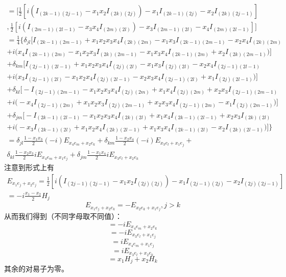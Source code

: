 \documentclass{ctexart}
\begin{document}
	\begin{multline}
	[E_{x_1e_j+x_2e_k},E_{x_3e_l+x_4e_m}]\\=\bigg[\frac{1}{2}\left[i(I_{(2k-1)(2j-1)}-x_1x_2 I_{(2k)(2j)})-x_1I_{(2k-1)(2j)}-x_2I_{(2k)(2j-1)}\right]\\,\frac{1}{2}\left[i(I_{(2m-1)(2l-1)}-x_3x_4 I_{(2m)(2l)})-x_3I_{(2m-1)(2l)}-x_4I_{(2m)(2l-1)}\right]\bigg]\\
	=\frac{1}{4}\bigg\{
	\delta_{jl}\Big[I_{(2k-1)(2m-1)}+x_1x_2x_3x_4I_{(2k)(2m)}-x_1x_3I_{(2k-1)(2m-1)}-x_2x_4I_{(2k)(2m)}\\
	+i\big(x_4I_{(2k-1)(2m)}-x_1x_2x_3I_{(2k)(2m-1)}-x_1x_3x_4I_{(2k-1)(2m)}+x_2I_{(2k)(2m-1)}\big)\Big]\\
	+\delta_{km}\Big[I_{(2j-1)(2l-1)}+x_1x_2x_3x_4I_{(2j)(2l)}-x_1x_3I_{(2j)(2l)}-x_2x_4I_{(2j-1)(2l-1)}\\
	+i\big(x_3I_{(2j-1)(2l)}-x_1x_2x_4I_{(2j)(2l-1)}-x_2x_3x_4I_{(2j-1)(2l)}+x_1I_{(2j)(2l-1)}\big)\Big]\\
	+\delta_{kl}\Big[-I_{(2j-1)(2m-1)}-x_1x_2x_3x_4I_{(2j)(2m)}+x_1x_4I_{(2j)(2m)}+x_2x_3I_{(2j-1)(2m-1)}\\
	+i\big(-x_4I_{(2j-1)(2m)}+x_1x_2x_3I_{(2j)(2m-1)}+x_2x_3x_4I_{(2j-1)(2m)}-x_1I_{(2j)(2m-1)}\big)\Big]\\
	+\delta_{jm}\Big[-I_{(2k-1)(2l-1)}-x_1x_2x_3x_4I_{(2k)(2l)}+x_1x_4I_{(2k-1)(2l-1)}+x_2x_3I_{(2k)(2l)}\\
	+i\big(-x_3I_{(2k-1)(2l)}+x_1x_2x_4I_{(2k)(2l-1)}+x_1x_3x_4I_{(2k-1)(2l)}-x_2I_{(2k)(2l-1)}\big)\Big]\bigg\}\\
	=\delta_{jl}\frac{1-x_1x_3}{2}(-i)E_{x_4e_m+x_2e_k}+\delta_{km}\frac{1-x_2x_4}{2}(-i)E_{x_3e_l+x_1e_j}+\\\delta_{kl}\frac{1-x_2x_3}{2}iE_{x_4e_m+x_1e_j}+\delta_{jm}\frac{1-x_1x_4}{2}iE_{x_3e_l+x_2e_k}
	\end{multline}
	注意到形式上有
	\begin{multline}
	E_{x_1e_j+x_2e_j}=\frac{1}{2}\left[i(I_{(2j-1)(2j-1)}-x_1x_2 I_{(2j)(2j)})-x_1I_{(2j-1)(2j)}-x_2I_{(2j)(2j-1)}\right]\\=-i\frac{x_1-x_2}{2}H_j
	\end{multline}
	\begin{equation}
	E_{x_1e_j+x_2e_k}=-E_{x_2e_k+x_1e_j},j>k
	\end{equation}
	从而我们得到（不同字母取不同值）：
	\begin{equation}
	[E_{x_1e_j+x_2e_k},E_{-x_1e_j+x_4e_m}]=-iE_{x_4e_m+x_2e_k}
	\end{equation}
	\begin{equation}
	[E_{x_1e_j+x_2e_k},E_{x_3e_l-x_2e_k}]=-iE_{x_3e_l+x_1e_j}
	\end{equation}
	\begin{equation}
	[E_{x_1e_j+x_2e_k},E_{-x_2e_k+x_4e_m}]=iE_{x_4e_m+x_1e_j}
	\end{equation}
	\begin{equation}
	[E_{x_1e_j+x_2e_k},E_{x_3e_l-x_1e_j}]=iE_{x_3e_l+x_2e_k}
	\end{equation}
	\begin{equation}
	[E_{x_1e_j+x_2e_k},E_{-x_1e_j-x_2e_k}]=x_1H_j+x_2H_k
	\end{equation}
	其余的对易子为零。
	
\end{document}

